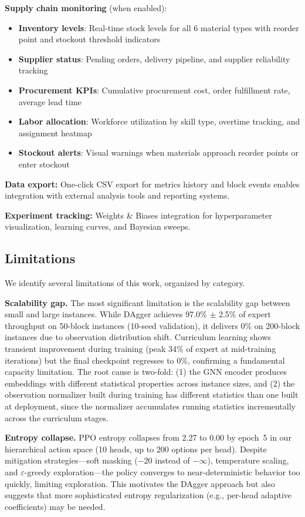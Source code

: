 \documentclass[11pt,a4paper]{article}
\begin{document}
\textbf{Supply chain monitoring} (when enabled):
\begin{itemize}
    \item \textbf{Inventory levels}: Real-time stock levels for all 6 material types with reorder point and stockout threshold indicators
    \item \textbf{Supplier status}: Pending orders, delivery pipeline, and supplier reliability tracking
    \item \textbf{Procurement KPIs}: Cumulative procurement cost, order fulfillment rate, average lead time
    \item \textbf{Labor allocation}: Workforce utilization by skill type, overtime tracking, and assignment heatmap
    \item \textbf{Stockout alerts}: Visual warnings when materials approach reorder points or enter stockout
\end{itemize}

\textbf{Data export:} One-click CSV export for metrics history and block events enables integration with external analysis tools and reporting systems.

\textbf{Experiment tracking:} Weights \& Biases integration for hyperparameter visualization, learning curves, and Bayesian sweeps.

\subsection{Limitations}
\label{sec:limitations}

We identify several limitations of this work, organized by category.

\textbf{Scalability gap.}
The most significant limitation is the scalability gap between small and large instances.
While DAgger achieves 97.0\% $\pm$ 2.5\% of expert throughput on 50-block instances (10-seed validation), it delivers 0\% on 200-block instances due to observation distribution shift.
Curriculum learning shows transient improvement during training (peak 34\% of expert at mid-training iterations) but the final checkpoint regresses to 0\%, confirming a fundamental capacity limitation.
The root cause is two-fold: (1) the GNN encoder produces embeddings with different statistical properties across instance sizes, and (2) the observation normalizer built during training has different statistics than one built at deployment, since the normalizer accumulates running statistics incrementally across the curriculum stages.

\textbf{Entropy collapse.}
PPO entropy collapses from 2.27 to 0.00 by epoch~5 in our hierarchical action space (10 heads, up to 200 options per head).
Despite mitigation strategies---soft masking ($-20$ instead of $-\infty$), temperature scaling, and $\varepsilon$-greedy exploration---the policy converges to near-deterministic behavior too quickly, limiting exploration.
This motivates the DAgger approach but also suggests that more sophisticated entropy regularization (e.g., per-head adaptive coefficients) may be needed.
\end{document}
